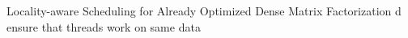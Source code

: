 \begin{frame}[label=ladmf]{Locality-aware Scheduling for Already Optimized Dense Matrix Factorization}
d ensure that threads work on same data
\end{frame}
